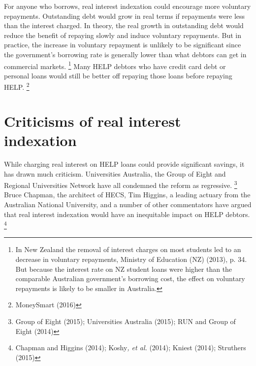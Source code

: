 \documentclass[embargoed]{grattan}
\begin{document}
For anyone who borrows, real interest indexation could encourage more voluntary repayments.
Outstanding debt would grow in real terms if repayments were less than the interest charged.
In theory, the real growth in outstanding debt would reduce the benefit of repaying slowly and induce voluntary repayments.
But in practice, the increase in voluntary repayment is unlikely to be significant since the government's borrowing rate is generally lower than what debtors can get in commercial markets.%
\footnote{In New Zealand the removal of interest charges on most students led to an decrease in voluntary repayments, Ministry of Education (NZ) (2013), p. 34.
But because the interest rate on NZ student loans were higher than the comparable Australian government's borrowing cost, the effect on voluntary repayments is likely to be smaller in Australia.} Many \gls{HELP} debtors who have credit card debt or personal loans would still be better off repaying those loans before repaying \gls{HELP}.%
\footnote{MoneySmart (2016)}

\section{Criticisms of real interest indexation}\label{sec:criticisms-of-real-interest-indexation}

While charging real interest on \gls{HELP} loans could provide significant savings, it has drawn much criticism.
Universities Australia, the Group of Eight and Regional Universities Network have all condemned the reform as regressive.%
\footnote{Group of Eight (2015); Universities Australia (2015); RUN and Group of Eight (2014)} Bruce Chapman, the architect of \gls{HECS}, Tim Higgins, a leading actuary from the Australian National University, and a number of other commentators have argued that real interest indexation would have an inequitable impact on \gls{HELP} debtors.%
\footnote{Chapman and Higgins (2014); Koshy\emph{, et al.} (2014); Kniest (2014); Struthers (2015)}
\end{document}
